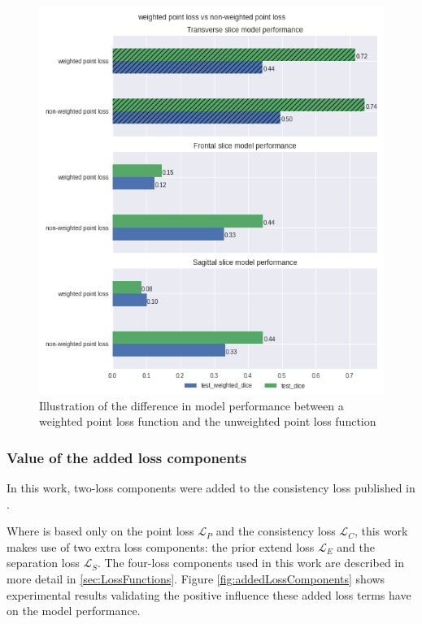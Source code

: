 \begin{figure}
    \centering
    \includegraphics[width=.95\textwidth]{images/weightedvsnonweighted.png}
    \caption{Illustration of the difference in model performance between a weighted point loss function and the unweighted point loss function\label{fig:weighted_vs_unweighted}}
\end{figure}


\subsubsection{Value of the added loss components}
\par{
    In this work, two-loss components were added to the consistency loss published in \cite{Laradji}.
    
    Where \cite{Laradji} is based only on the point loss $\mathcal{L}_P$ and the consistency loss $\mathcal{L}_C$, this work makes use of two extra loss components:
    the prior extend loss $\mathcal{L}_E$ and the separation loss $\mathcal{L}_S$. The four-loss components used in this work are described in more detail in \ref{sec:LossFunctions}.
    Figure \ref{fig:addedLossComponents} shows experimental results validating the positive influence these added loss terms have on the model performance.
}


